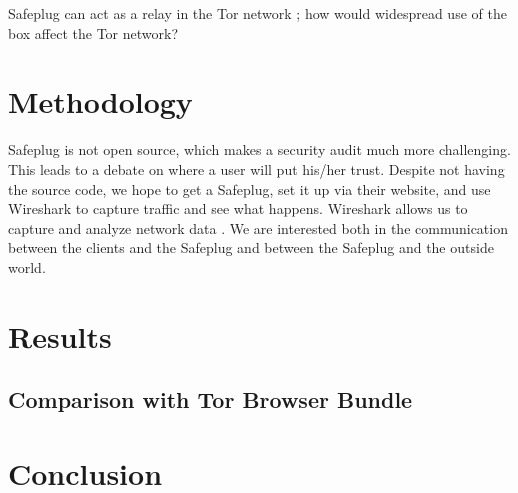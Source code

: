\documentclass[12pt, letterpaper]{article}
\begin{document}
Safeplug can act as a relay in the Tor network \cite{techreview}; how would widespread use of the box affect the Tor network?

\section{Methodology}
Safeplug is not open source, which makes a security audit much more challenging.  This leads to a debate on where a user will put his/her trust.  Despite not having the source code, we hope to get a Safeplug, set it up via their website, and use Wireshark to capture traffic and see what happens.  Wireshark allows us to capture and analyze network data \cite{wireshark}.  We are interested both in the communication between the clients and the Safeplug and between the Safeplug and the outside world.  

\section{Results}

\subsection{Comparison with Tor Browser Bundle}

\section{Conclusion}


\end{document}
